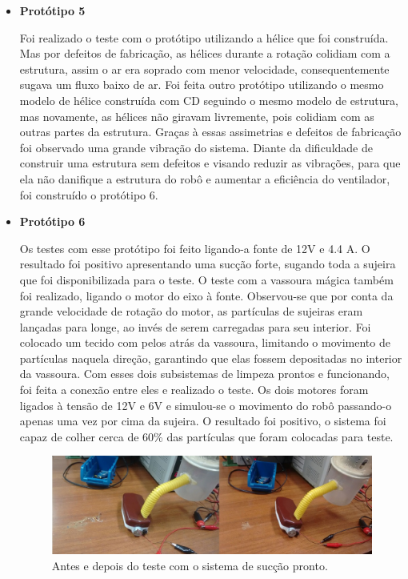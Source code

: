 \begin{itemize}
\item \textbf{Protótipo 5}

Foi realizado o teste com o protótipo utilizando a hélice que foi construída. Mas por defeitos de fabricação, as hélices durante a rotação colidiam com a estrutura, assim o ar era soprado com menor velocidade, consequentemente sugava um fluxo baixo de ar. 
Foi feita outro protótipo utilizando o mesmo modelo de hélice construída com CD seguindo o mesmo modelo de estrutura, mas novamente, as hélices não giravam livremente, pois colidiam com as outras partes da estrutura. Graças à essas assimetrias e defeitos de fabricação foi observado uma grande vibração do sistema. Diante da dificuldade de construir uma estrutura sem defeitos e visando reduzir as vibrações, para que ela não danifique a estrutura do robô e aumentar a eficiência do ventilador, foi construído o protótipo 6.

\item \textbf{Protótipo 6}

Os testes com esse protótipo foi feito ligando-a fonte de 12V e 4.4 A. O resultado foi positivo apresentando uma sucção forte, sugando toda a sujeira que foi disponibilizada para o teste. O teste com a vassoura mágica também foi realizado, ligando o motor do eixo à fonte. Observou-se que por conta da grande velocidade de rotação do motor, as partículas de sujeiras eram lançadas para longe, ao invés de serem carregadas para seu interior. Foi colocado um tecido com pelos atrás da vassoura, limitando o movimento de partículas naquela direção, garantindo que elas fossem depositadas no interior da vassoura. Com esses dois subsistemas de limpeza prontos e funcionando, foi feita a conexão entre eles e realizado o teste. Os dois motores foram ligados à tensão de 12V e 6V e simulou-se o movimento do robô passando-o apenas uma vez por cima da sujeira. O resultado foi positivo, o sistema foi capaz de colher cerca de 60\% das partículas que foram colocadas para teste.

	\begin{figure}[H]
			\centering
			\includegraphics[scale=0.5]{figuras/antes_e_depois_succao.jpg}
			\caption{Antes e depois do teste com o sistema de sucção pronto.}
			\label{img:antes_e_depois}
		\end{figure}
\end{itemize}

